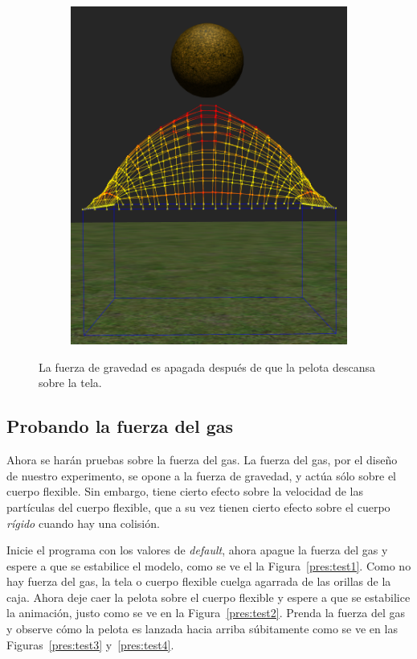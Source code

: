 \begin{figure}
\begin{subfigure}[b]{0.3\textwidth}
  \end{subfigure}
~
  \begin{subfigure}[b]{0.3\textwidth}
    \includegraphics[width=\textwidth]{Img/04/gravityOff3}
  \end{subfigure}
 \caption[Experimento: Apagar la fuerza de gravedad]{La fuerza de gravedad es apagada después de que la pelota descansa sobre la tela.} 
 \label{fig:noGravity}
\end{figure}

\subsection{Probando la fuerza del gas}
Ahora se harán pruebas sobre la fuerza del gas. La fuerza del gas, por el diseño de nuestro experimento, se opone a la fuerza de gravedad, y actúa sólo sobre el cuerpo flexible.
Sin embargo, tiene cierto efecto sobre la velocidad de las partículas del cuerpo flexible, que a su vez tienen cierto efecto sobre el cuerpo \emph{rígido} cuando hay una colisión.

Inicie el programa con los valores de \emph{\textenglish{default}}, ahora apague la fuerza del gas y espere a que se estabilice el modelo, como se ve el la Figura~\ref{pres:test1}.
Como no hay fuerza del gas, la tela o cuerpo flexible cuelga agarrada de las orillas de la caja.
Ahora deje caer la pelota sobre el cuerpo flexible y espere a que se estabilice la animación, justo como se ve en la Figura~\ref{pres:test2}. 
Prenda la fuerza del gas y observe cómo la pelota es lanzada hacia arriba súbitamente como se ve en las Figuras~\ref{pres:test3} y~\ref{pres:test4}.


